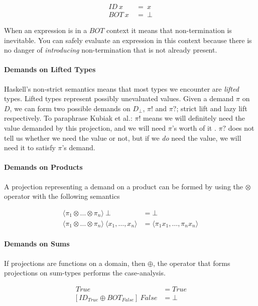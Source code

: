 \begin{align}
ID \ x \ &= \ x \\
BOT \ x \ &= \ \bot
\end{align}


When an expression is in a $BOT$ context it means that non-termination is
inevitable. You can safely evaluate an expression in this context because there
is no danger of \emph{introducing} non-termination that is not already present.

\paragraph{Demands on Lifted Types} Haskell's non-strict semantics means that
most types we encounter are \emph{lifted} types.  Lifted types represent
possibly unevaluated values. Given a demand $\pi$ on $D$, we can form two
possible demands on $D_{\bot}$, $\pi!$ and $\pi?$; strict lift and lazy lift
respectively. To paraphrase Kubiak et al.: $\pi!$ means we will definitely need
the value demanded by this projection, and we will need $\pi$'s worth of it
\citep{kubiak}. $\pi?$ does not tell us whether we need the value or not, but if
we \emph{do} need the value, we will need it to satisfy $\pi$'s demand.

\paragraph{Demands on Products} A projection representing a demand on a product
can be formed by using the $\otimes$ operator with the following semantics

\begin{align*}
\langle \pi_{1} \otimes \dots \otimes \pi_{n} \rangle \ \bot &= \bot \\
\langle \pi_{1} \otimes \dots \otimes \pi_{n} \rangle \ 
\langle x_{1}, \dots, x_{n} \rangle &= \langle \pi_{1} x_{1}, \dots, \pi_{n} x_{n} \rangle
\end{align*}

\paragraph{Demands on Sums} If projections are functions on a domain, then
$\oplus$, the operator that forms projections on sum-types performs the case-analysis.

\begin{align*}
[ID_{True} \oplus ID_{False}]  \ True &= True \\
[ID_{True} \oplus BOT_{False}] \ False &= \bot
\end{align*}

